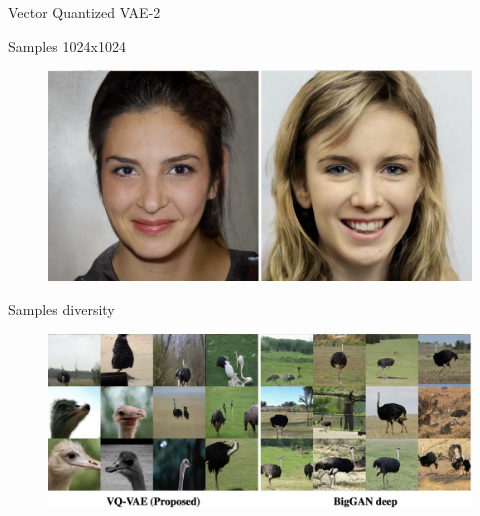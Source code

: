 \begin{frame}{Vector Quantized VAE-2}
	\begin{block}{Samples 1024x1024}
		\vspace{-0.2cm}
		\begin{figure}
			\centering
			\includegraphics[width=0.63\linewidth]{figs/vqvae2_faces}
		\end{figure}
	\end{block}
	\vspace{-0.6cm}
	\begin{block}{Samples diversity}
		\vspace{-0.2cm}
		\begin{figure}
			\centering
			\includegraphics[width=0.65\linewidth]{figs/vqvae2_diversity}
		\end{figure}
	\end{block}
\end{frame}
